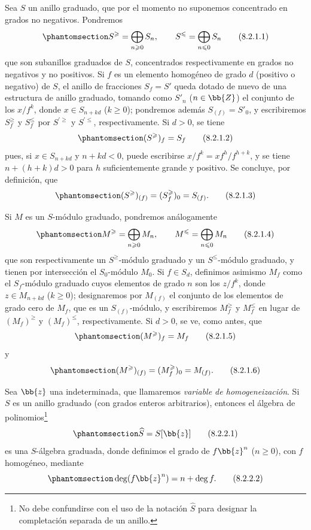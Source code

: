 \documentclass[oneside,10pt]{amsart}
\renewcommand{\leq}{\leqslant}
\renewcommand{\geq}{\geqslant}
\newcommand{\oldpage}[2][]{\marginnote{\normalfont\footnotesize\textbf{#1}~|~#2}\ignorespaces}
\let\EGAOriginalLabel\label
\renewcommand{\label}[1]{\phantomsection\EGAOriginalLabel{#1}}
\begin{document}
\begin{env}[8.2.1]
\label{II.8.2.1}
Sea $S$ un anillo graduado, que por el momento no suponemos concentrado en grados no negativos.
Pondremos
\[
\label{II.8.2.1.1}
  S^\geq=\bigoplus_{n\geq0}S_n,
  \qquad
  S^\leq=\bigoplus_{n\leq0}S_n
\tag{8.2.1.1}
\]
que son subanillos graduados de $S$, concentrados respectivamente en grados no negativos y no positivos.
Si $f$ es un elemento homogéneo de grado $d$ (positivo o negativo) de $S$, el anillo de fracciones $S_f=S'$ queda dotado de nuevo de una estructura de anillo graduado, tomando como $S'_n$ ($n\in\bb{Z}$) el conjunto de los $x/f^k$, donde $x\in S_{n+kd}$ ($k\geq0$);
pondremos además $S_{(f)}=S'_0$, y escribiremos $S_f^\geq$ y $S_f^\leq$ por $S^{'\geq}$ y $S^{'\leq}$, respectivamente.
Si $d>0$, se tiene
\[
\label{II.8.2.1.2}
  (S^\geq)_f=S_f
\tag{8.2.1.2}
\]
pues, si $x\in S_{n+kd}$ y $n+kd<0$, puede escribirse $x/f^k=xf^h/f^{h+k}$, y se tiene $n+(h+k)d>0$ para $h$ suficientemente grande y positivo.
Se concluye, por definición, que
\[
\label{II.8.2.1.3}
  (S^\geq)_{(f)}=(S_f^\geq)_0=S_{(f)}.
\tag{8.2.1.3}
\]

Si $M$ es un $S$-módulo graduado, pondremos análogamente
\[
\label{II.8.2.1.4}
  M^\geq=\bigoplus_{n\geq0}M_n,
  \qquad
  M^\leq=\bigoplus_{n\leq0}M_n
\tag{8.2.1.4}
\]
que son respectivamente un $S^\geq$-módulo graduado y un $S^\leq$-módulo graduado, y tienen por intersección el $S_0$-módulo $M_0$.
Si $f\in S_d$, definimos asimismo $M_f$ como el $S_f$-módulo graduado cuyos elementos de grado $n$ son los $z/f^k$, donde $z\in M_{n+kd}$ ($k\geq0$);
designaremos por $M_{(f)}$ el conjunto de los elementos de grado cero de $M_f$, que es un $S_{(f)}$-módulo, y escribiremos $M_f^\geq$ y $M_f^\leq$ en lugar de $(M_f)^\geq$ y $(M_f)^\leq$, respectivamente.
Si $d>0$, se ve, como antes, que
\[
\label{II.8.2.1.5}
  (M^\geq)_f=M_f
\tag{8.2.1.5}
\]
y
\[
\label{II.8.2.1.6}
  (M^\geq)_{(f)}=(M_f^\geq)_0=M_{(f)}.
\tag{8.2.1.6}
\]
\end{env}

\begin{env}[8.2.2]
\label{II.8.2.2}
Sea $\bb{z}$ una indeterminada, que llamaremos \emph{variable de homogeneización}.
Si $S$ es un anillo graduado (con grados enteros arbitrarios), entonces el álgebra de polinomios\footnote{No debe confundirse con el uso de la notación $\widehat{S}$ para designar la completación separada de un anillo.}
\[
\label{II.8.2.2.1}
  \widehat{S}=S[\bb{z}]
\tag{8.2.2.1}
\]
\oldpage[II]{158}
es una $S$-álgebra graduada, donde definimos el grado de $f\bb{z}^n$ ($n\geq0$), con $f$ homogéneo, mediante
\[
\label{II.8.2.2.2}
  \deg(f\bb{z}^n)=n+\deg f.
\tag{8.2.2.2}
\]
\end{env}
\end{document}
